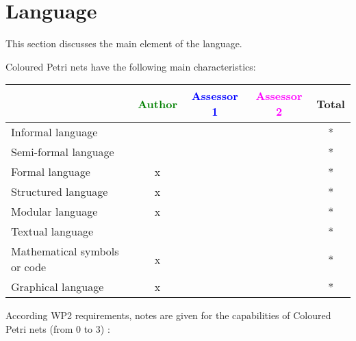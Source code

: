 \section{Language}
This section discusses the main element of the language.

Coloured Petri nets have the following main characteristics:

\begin{tabular}{|l | c | c | c | c|}
\hline
& \textcolor{green}{Author} & \textcolor{blue}{Assessor 1} & \textcolor{magenta}{Assessor 2} & Total \\
\hline 
Informal language & & & & * \\
\hline 
Semi-formal language & & & & * \\
\hline
Formal language & x & & & * \\
\hline
Structured language & x & & & * \\
\hline
Modular language & x & & & * \\
\hline
Textual language & & & & * \\
\hline
Mathematical symbols or code & x & & & * \\
\hline
Graphical language & x & & & * \\
\hline
\end{tabular}

According WP2 requirements, notes are given for the capabilities of Coloured Petri nets (from 0 to 3) :

